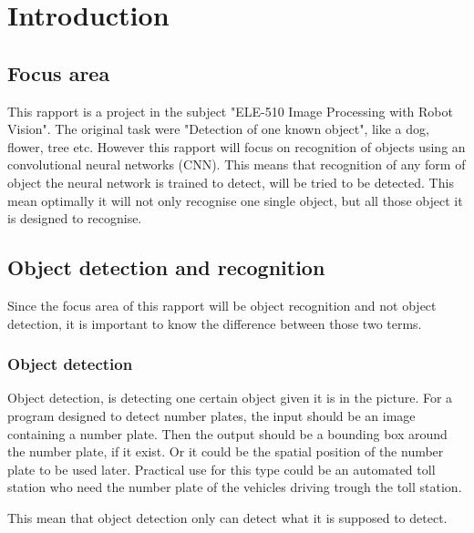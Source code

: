 \newpage
{}
\setcounter{page}{4}
\section{Introduction}

\subsection{Focus area}
This rapport is a project in the subject "ELE-510 Image Processing with Robot Vision". The original task were "Detection of one known object", like a dog, flower, tree etc. However this rapport will focus on recognition of objects using an convolutional neural networks (CNN). This means that recognition of any form of object the neural network is trained to detect, will be tried to be detected. This mean optimally it will not only recognise one single object, but all those object it is designed to recognise. 

\subsection{Object detection and recognition}
Since the focus area of this rapport will be object recognition and not object detection, it is important to know the difference between those two terms. 

\subsubsection*{Object detection}
Object detection, is detecting one certain object given it is in the picture. For a program designed to detect number plates, the input should be an image containing a number plate. Then the output should be a bounding box around the number plate, if it exist. Or it could be the spatial position of the number plate to be used later. Practical use for this type could be an automated toll station who need the number plate of the vehicles driving trough the toll station.

This mean that object detection only can detect what it is supposed to detect.

